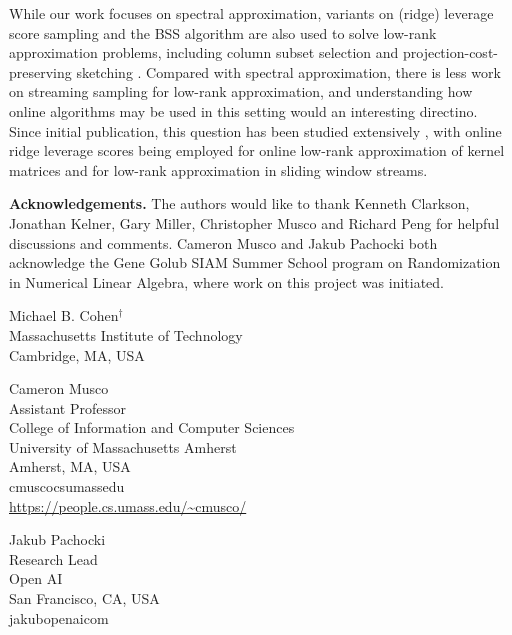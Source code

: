 \documentclass{toc}
\begin{document}
While our work focuses on spectral approximation, variants on (ridge) leverage score sampling and the BSS algorithm are also used to solve low-rank approximation problems, including column subset selection \cite{boutsidis2014optimal,cohen2015ridge} and projection-cost-preserving sketching \cite{cohen2014dimensionality,cohen2015ridge}. Compared with spectral approximation, there is less work on streaming sampling for low-rank approximation, and understanding how online algorithms may be used in this setting would an interesting directino. Since initial publication, this question has been studied  extensively \cite{braverman2018numerical,calandriello2017second,calandriello2017efficient}, with online ridge leverage scores being employed for online low-rank approximation of kernel matrices and for low-rank approximation in sliding window streams.

\medskip

\noindent\textbf{Acknowledgements.}
The authors would like to thank Kenneth Clarkson, Jonathan Kelner, Gary Miller, Christopher Musco and Richard Peng for helpful discussions and comments.
Cameron Musco and Jakub Pachocki both acknowledge the Gene Golub SIAM Summer School program on Randomization in Numerical Linear Algebra, where work on this project was initiated.

\nocite{conf-version}


%
%
%
%


%
%
%
%
%
\begin{tocauthors}

\begin{tocinfo}[cohen]
  Michael B. Cohen$^\dagger$\\
  Massachusetts Institute of Technology\\
  Cambridge, MA, USA\\
%
\end{tocinfo}

\begin{tocinfo}[musco]
 Cameron Musco\\
 Assistant Professor\\
 College of Information and Computer Sciences\\
 University of Massachusetts Amherst\\
 Amherst, MA, USA\\
 cmusco\tocat{}cs\tocdot{}umass\tocdot{}edu \\   %
 \url{https://people.cs.umass.edu/~cmusco/}      %
\end{tocinfo}

\begin{tocinfo}[pachocki]   %
  Jakub Pachocki\\
  Research Lead\\
  Open AI\\
  San Francisco, CA, USA\\
  jakub\tocat{}openai\tocdot{}com\\
\end{tocinfo}
\end{tocauthors}
\end{document}
